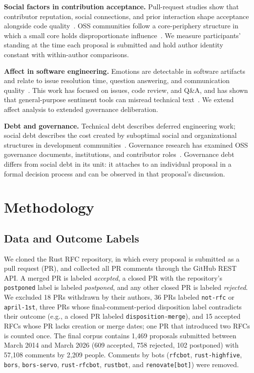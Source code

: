 \documentclass[conference]{IEEEtran}
\begin{document}
\textbf{Social factors in contribution acceptance.} Pull-request studies show that contributor reputation, social connections, and prior interaction shape acceptance alongside code quality~\cite{tsay2014influence, gousios2014dataset, gousios2015work, dey2020effect, iyer2019effects}. OSS communities follow a core-periphery structure in which a small core holds disproportionate influence~\cite{crowston2005social, crowston2006hierarchy, steinmacher2015social}. We measure participants' standing at the time each proposal is submitted and hold author identity constant with within-author comparisons.

\textbf{Affect in software engineering.} Emotions are detectable in software artifacts and relate to issue resolution time, question answering, and communication quality~\cite{murgia2014developers, ortu2015bullies, calefato2018ask, islam2018sentistrength}. This work has focused on issues, code review, and Q\&A, and has shown that general-purpose sentiment tools can misread technical text~\cite{novielli2019sentiment}. We extend affect analysis to extended governance deliberation.

\textbf{Debt and governance.} Technical debt describes deferred engineering work; social debt describes the cost created by suboptimal social and organizational structures in development communities~\cite{tamburri2013social}. Governance research has examined OSS governance documents, institutions, and contributor roles~\cite{yin2022open, yan2023github, gerosa2021shifting, trinkenreich2020hidden}. Governance debt differs from social debt in its unit: it attaches to an individual proposal in a formal decision process and can be observed in that proposal's discussion.

\section{Methodology}

\subsection{Data and Outcome Labels}
We cloned the Rust RFC repository, in which every proposal is submitted as a pull request (PR), and collected all PR comments through the GitHub REST API. A merged PR is labeled \emph{accepted}, a closed PR with the repository's \texttt{postponed} label is labeled \emph{postponed}, and any other closed PR is labeled \emph{rejected}. We excluded 18 PRs withdrawn by their authors, 36 PRs labeled \texttt{not-rfc} or \texttt{april-1st}, three PRs whose final-comment-period disposition label contradicts their outcome (e.g., a closed PR labeled \texttt{disposition-merge}), and 15 accepted RFCs whose PR lacks creation or merge dates; one PR that introduced two RFCs is counted once. The final corpus contains 1,469 proposals submitted between March 2014 and March 2026 (609 accepted, 758 rejected, 102 postponed) with 57,108 comments by 2,209 people. Comments by bots (\texttt{rfcbot}, \texttt{rust-highfive}, \texttt{bors}, \texttt{bors-servo}, \texttt{rust-rfcbot}, \texttt{rustbot}, and \texttt{renovate[bot]}) were removed.
\end{document}
